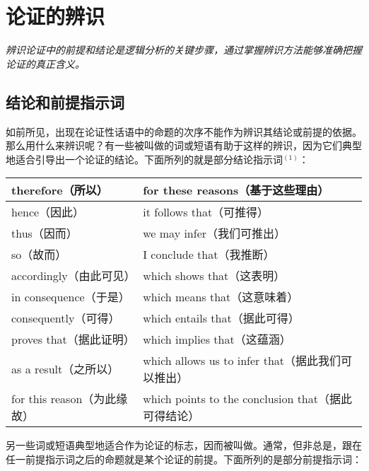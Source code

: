 \section{论证的辨识}

\begin{logicbox}[title=引言]
\textit{辨识论证中的前提和结论是逻辑分析的关键步骤，通过掌握辨识方法能够准确把握论证的真正含义。}
\end{logicbox}

\subsection{结论和前提指示词}

如前所见，出现在论证性话语中的命题的次序不能作为辨识其结论或前提的依据。那么用什么来辨识呢？有一些被叫做的词或短语有助于这样的辨识，因为它们典型地适合引导出一个论证的结论。下面所列的就是部分结论指示词${}^{(1)}$：

\begin{center}
\begin{tabular}{|l|l|}
\hline
therefore（所以） & for these reasons（基于这些理由） \\
\hline
hence（因此） & it follows that（可推得） \\
\hline
thus（因而） & we may infer（我们可推出） \\
\hline
so（故而） & I conclude that（我推断） \\
\hline
accordingly（由此可见） & which shows that（这表明） \\
\hline
in consequence（于是） & which means that（这意味着） \\
\hline
consequently（可得） & which entails that（据此可得） \\
\hline
proves that（据此证明） & which implies that（这蕴涵） \\
\hline
as a result（之所以） & which allows us to infer that（据此我们可以推出） \\
\hline
for this reason（为此缘故） & which points to the conclusion that（据此可得结论） \\
\hline
\end{tabular}
\end{center}

另一些词或短语典型地适合作为论证的标志，因而被叫做。通常，但非总是，跟在任一前提指示词之后的命题就是某个论证的前提。下面所列的是部分前提指示词：

